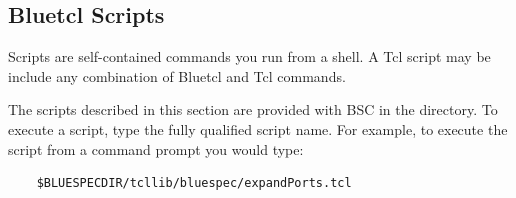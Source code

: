












\subsection{Bluetcl Scripts}
Scripts are self-contained commands you run from a shell.  A Tcl
script may be include any combination of Bluetcl and Tcl commands. 

The scripts described in this section are provided with BSC in the
 directory.
To execute a script, type the fully qualified script name.  For
example, to execute the  script from a command prompt you would type:
\begin{verbatim}
    $BLUESPECDIR/tcllib/bluespec/expandPorts.tcl
\end{verbatim}

